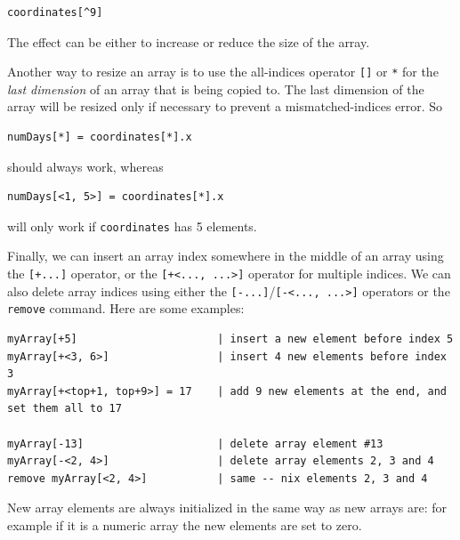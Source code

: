 \documentclass{article}
\newenvironment{code}{
       \begin{list}{}{
               \setlength{\leftmargin}{.4in}
               \setlength{\rightmargin}{0in}
               \setlength{\topsep}{.2in}
       }
       \small
       \item[] }
       { \end{list}   }
\begin{document}
\begin{code} \begin{verbatim}
coordinates[^9]
\end{verbatim} \end{code}

\noindent The effect can be either to increase or reduce the size of the array.

Another way to resize an array is to use the all-indices operator \verb#[]# or \verb#*# for the \emph{last dimension} of an array that is being copied to.  The last dimension of the array will be resized only if necessary to prevent a mismatched-indices error.  So

\begin{code} \begin{verbatim}
numDays[*] = coordinates[*].x
\end{verbatim} \end{code}

\noindent should always work, whereas

\begin{code} \begin{verbatim}
numDays[<1, 5>] = coordinates[*].x
\end{verbatim} \end{code}

\noindent will only work if \verb#coordinates# has 5 elements.

Finally, we can insert an array index somewhere in the middle of an array using the \verb#[+...]# operator, or the \verb#[+<..., ...>]# operator for multiple indices.  We can also delete array indices using either the \verb#[-...]#/\verb#[-<..., ...>]# operators or the \verb#remove# command.  Here are some examples:

\begin{code} \begin{verbatim}
myArray[+5]                      | insert a new element before index 5
myArray[+<3, 6>]                 | insert 4 new elements before index 3
myArray[+<top+1, top+9>] = 17    | add 9 new elements at the end, and set them all to 17

myArray[-13]                     | delete array element #13
myArray[-<2, 4>]                 | delete array elements 2, 3 and 4
remove myArray[<2, 4>]           | same -- nix elements 2, 3 and 4
\end{verbatim} \end{code}

\noindent New array elements are always initialized in the same way as new arrays are:  for example if it is a numeric array the new elements are set to zero.
\end{document}
